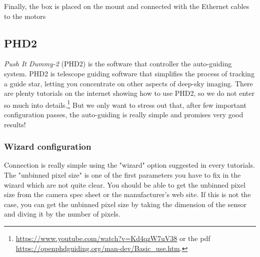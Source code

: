 
Finally, the box is placed on the mount and connected with the Ethernet cables to the motors

\subsection{PHD2}
\textit{Push It Dummy-2} (PHD2) is the software that controller the auto-guiding system.
PHD2 is telescope guiding software that simplifies the process of tracking a guide star, letting you concentrate on other aspects of deep-sky imaging.
There are plenty tutorials on the internet showing how to use PHD2, so we do not enter so much into details.\footnote{\url{https://www.youtube.com/watch?v=Kd4qzW7uV38} or the pdf \url{https://openphdguiding.org/man-dev/Basic_use.htm}.}
But we only want to stress out that, after few important configuration passes, the auto-guiding is really simple and promises very good results!

\subsubsection{Wizard configuration}
Connection is really simple using the "wizard" option suggested in every tutorials.
The "unbinned pixel size" is one of the first parameters you have to fix in the wizard which are not quite clear.
You should be able to get the unbinned pixel size from the camera spec sheet or the manufacturer's web site.
If this is not the case, you can get the unbinned pixel size by taking the dimension of the sensor and diving it by the number of pixels.

